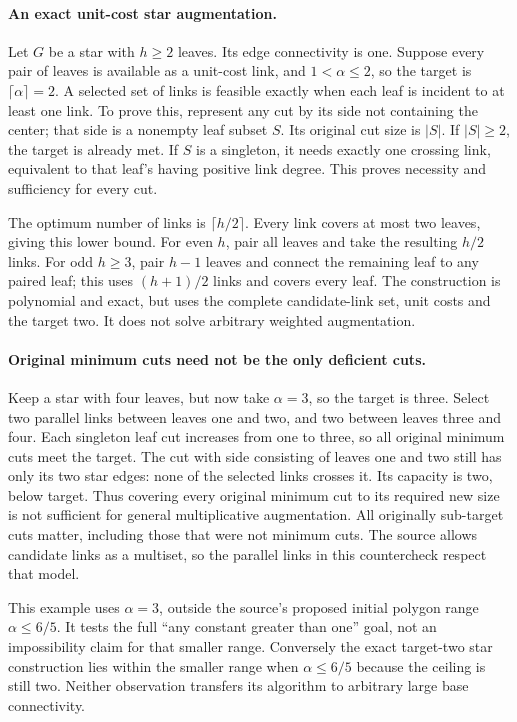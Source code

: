 \documentclass[11pt]{article}
\begin{document}
\paragraph{An exact unit-cost star augmentation.}
Let $G$ be a star with $h\ge2$ leaves. Its edge
connectivity is one. Suppose every pair of leaves is available
as a unit-cost link, and $1<\alpha\le2$, so the target
is $\lceil\alpha\rceil=2$. A selected set of links is
feasible exactly when each leaf is incident to at least one link.
To prove this, represent any cut by its side not containing the
center; that side is a nonempty leaf subset $S$. Its original
cut size is $|S|$. If $|S|\ge2$, the target is
already met. If $S$ is a singleton, it needs exactly one
crossing link, equivalent to that leaf's having positive link degree.
This proves necessity and sufficiency for every cut.

The optimum number of links is $\lceil h/2\rceil$.
Every link covers at most two leaves, giving this lower bound.
For even $h$, pair all leaves and take the resulting $h/2$
links. For odd $h\ge3$, pair $h-1$ leaves and connect
the remaining leaf to any paired leaf; this uses $(h+1)/2$
links and covers every leaf. The construction is polynomial and
exact, but uses the complete candidate-link set, unit costs and
the target two. It does not solve arbitrary weighted augmentation.

\paragraph{Original minimum cuts need not be the only deficient cuts.}
Keep a star with four leaves, but now take $\alpha=3$,
so the target is three. Select two parallel links between leaves
one and two, and two between leaves three and four. Each singleton
leaf cut increases from one to three, so all original minimum
cuts meet the target. The cut with side consisting of leaves
one and two still has only its two star edges: none of the
selected links crosses it. Its capacity is two, below target.
Thus covering every original minimum cut to its required new
size is not sufficient for general multiplicative augmentation.
All originally sub-target cuts matter, including those that were
not minimum cuts. The source allows candidate links as a multiset,
so the parallel links in this countercheck respect that model.

This example uses $\alpha=3$, outside the source's proposed
initial polygon range $\alpha\le6/5$. It tests the full
``any constant greater than one'' goal, not an impossibility claim
for that smaller range. Conversely the exact target-two star
construction lies within the smaller range when $\alpha\le6/5$
because the ceiling is still two. Neither observation transfers
its algorithm to arbitrary large base connectivity.
\end{document}
